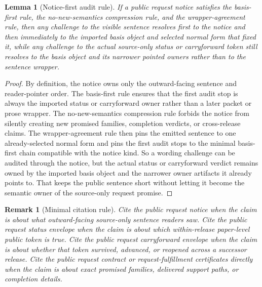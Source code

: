 \documentclass[11pt]{article}
\newtheorem{lemma}{Lemma}
\newtheorem{remark}{Remark}
\begin{document}
\begin{lemma}[Notice-first audit rule]
If a public request notice satisfies the basis-first rule, the no-new-semantics compression rule, and the wrapper-agreement rule, then any challenge to the visible sentence resolves first to the notice and then immediately to the imported basis object and selected normal form that fixed it, while any challenge to the actual source-only status or carryforward token still resolves to the basis object and its narrower pointed owners rather than to the sentence wrapper.
\end{lemma}

\begin{proof}
By definition, the notice owns only the outward-facing sentence and reader-pointer order.
The basis-first rule ensures that the first audit stop is always the imported status or carryforward owner rather than a later packet or prose wrapper.
The no-new-semantics compression rule forbids the notice from silently creating new promised families, completion verdicts, or cross-release claims.
The wrapper-agreement rule then pins the emitted sentence to one already-selected normal form and pins the first audit stops to the minimal basis-first chain compatible with the notice kind.
So a wording challenge can be audited through the notice, but the actual status or carryforward verdict remains owned by the imported basis object and the narrower owner artifacts it already points to.
That keeps the public sentence short without letting it become the semantic owner of the source-only request promise.\qedhere
\end{proof}

\begin{remark}[Minimal citation rule]
Cite the public request notice when the claim is about \emph{what outward-facing source-only sentence readers saw}.
Cite the public request status envelope when the claim is about \emph{which within-release paper-level public token is true}.
Cite the public request carryforward envelope when the claim is about \emph{whether that token survived, advanced, or reopened across a successor release}.
Cite the public request contract or request-fulfillment certificates directly when the claim is about exact promised families, delivered support paths, or completion details.
\end{remark}
\end{document}
